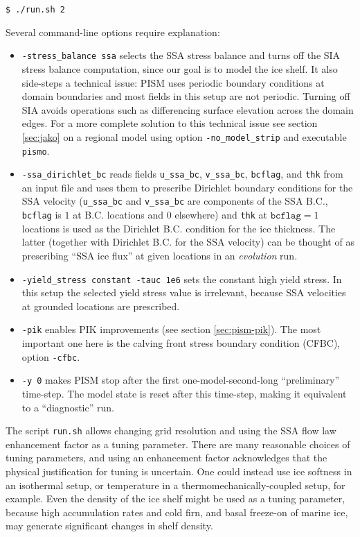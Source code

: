 \begin{verbatim}
$ ./run.sh 2
\end{verbatim}%

\noindent Several command-line options require explanation:
\begin{itemize}
\item \texttt{-stress_balance ssa} selects the SSA stress balance and
  turns off the SIA stress balance computation, since our goal is to
  model the ice shelf. It also side-steps a technical issue: PISM uses
  periodic boundary conditions at domain boundaries and most fields in
  this setup are not periodic. Turning off SIA avoids operations such
  as differencing surface elevation across the domain edges. For a
  more complete solution to this technical issue see section
  \ref{sec:jako} on a regional model using option
  \verb|-no_model_strip| and executable \verb|pismo|.
\item \texttt{-ssa_dirichlet_bc} reads fields \texttt{u_ssa_bc}, \texttt{v_ssa_bc}, \texttt{bcflag}, and \texttt{thk} from an input file and uses them to prescribe Dirichlet boundary conditions for the SSA velocity (\texttt{u_ssa_bc} and \texttt{v_ssa_bc} are components of the SSA B.C., \texttt{bcflag} is $1$ at B.C. locations and $0$ elsewhere) and \texttt{thk} at $\mathtt{bcflag} = 1$ locations is used as the Dirichlet B.C. condition for the ice thickness. The latter (together with Dirichlet B.C. for the SSA velocity) can be thought of as prescribing ``SSA ice flux'' at given locations in an \emph{evolution} run.
\item \texttt{-yield_stress constant -tauc 1e6} sets the constant high yield stress. In this setup the selected yield stress value is irrelevant, because SSA velocities at grounded locations are prescribed.
\item \texttt{-pik} enables PIK improvements (see section \ref{sec:pism-pik}). The most important one here is the calving front stress boundary condition (CFBC), option \verb|-cfbc|.
\item \texttt{-y 0} makes PISM stop after the first one-model-second-long ``preliminary'' time-step.  The model state is reset after this time-step, making it equivalent to a ``diagnostic'' run.
\end{itemize}

The script \texttt{run.sh} allows changing grid resolution and using the SSA flow law enhancement factor as a tuning parameter.  There are many reasonable choices of tuning parameters, and using an enhancement factor acknowledges that the physical justification for tuning is uncertain.  One could instead use ice softness in an isothermal setup, or temperature in a thermomechanically-coupled setup, for example.  Even the density of the ice shelf might be used as a tuning parameter, because high accumulation rates and cold firn, and basal freeze-on of marine ice, may generate significant changes in shelf density.

